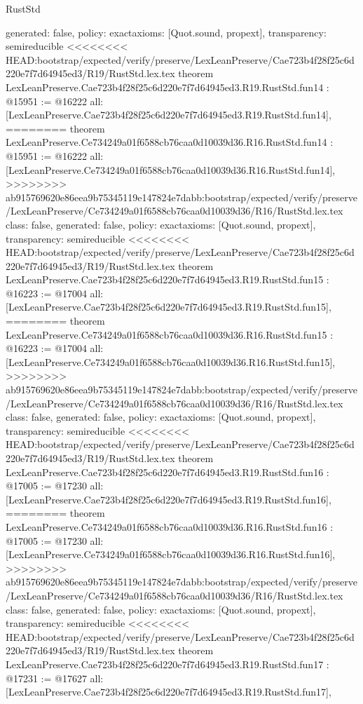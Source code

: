 \begin{lexlean}{RustStd}
\begin{coremodule}
{\begin{coremodule}
{{{{{{{{{{{{{{{{{  generated: false,
  policy: exact{axioms: [Quot.sound, propext]},
  transparency: semireducible
}
<<<<<<<< HEAD:bootstrap/expected/verify/preserve/LexLeanPreserve/Cae723b4f28f25c6d220e7f7d64945ed3/R19/RustStd.lex.tex
theorem LexLeanPreserve.Cae723b4f28f25c6d220e7f7d64945ed3.R19.RustStd.fun14 : @15951 := @16222 {
  all: [LexLeanPreserve.Cae723b4f28f25c6d220e7f7d64945ed3.R19.RustStd.fun14],
========
theorem LexLeanPreserve.Ce734249a01f6588cb76caa0d10039d36.R16.RustStd.fun14 : @15951 := @16222 {
  all: [LexLeanPreserve.Ce734249a01f6588cb76caa0d10039d36.R16.RustStd.fun14],
>>>>>>>> ab915769620e86eea9b75345119e147824e7dabb:bootstrap/expected/verify/preserve/LexLeanPreserve/Ce734249a01f6588cb76caa0d10039d36/R16/RustStd.lex.tex
  class: false,
  generated: false,
  policy: exact{axioms: [Quot.sound, propext]},
  transparency: semireducible
}
<<<<<<<< HEAD:bootstrap/expected/verify/preserve/LexLeanPreserve/Cae723b4f28f25c6d220e7f7d64945ed3/R19/RustStd.lex.tex
theorem LexLeanPreserve.Cae723b4f28f25c6d220e7f7d64945ed3.R19.RustStd.fun15 : @16223 := @17004 {
  all: [LexLeanPreserve.Cae723b4f28f25c6d220e7f7d64945ed3.R19.RustStd.fun15],
========
theorem LexLeanPreserve.Ce734249a01f6588cb76caa0d10039d36.R16.RustStd.fun15 : @16223 := @17004 {
  all: [LexLeanPreserve.Ce734249a01f6588cb76caa0d10039d36.R16.RustStd.fun15],
>>>>>>>> ab915769620e86eea9b75345119e147824e7dabb:bootstrap/expected/verify/preserve/LexLeanPreserve/Ce734249a01f6588cb76caa0d10039d36/R16/RustStd.lex.tex
  class: false,
  generated: false,
  policy: exact{axioms: [Quot.sound, propext]},
  transparency: semireducible
}
<<<<<<<< HEAD:bootstrap/expected/verify/preserve/LexLeanPreserve/Cae723b4f28f25c6d220e7f7d64945ed3/R19/RustStd.lex.tex
theorem LexLeanPreserve.Cae723b4f28f25c6d220e7f7d64945ed3.R19.RustStd.fun16 : @17005 := @17230 {
  all: [LexLeanPreserve.Cae723b4f28f25c6d220e7f7d64945ed3.R19.RustStd.fun16],
========
theorem LexLeanPreserve.Ce734249a01f6588cb76caa0d10039d36.R16.RustStd.fun16 : @17005 := @17230 {
  all: [LexLeanPreserve.Ce734249a01f6588cb76caa0d10039d36.R16.RustStd.fun16],
>>>>>>>> ab915769620e86eea9b75345119e147824e7dabb:bootstrap/expected/verify/preserve/LexLeanPreserve/Ce734249a01f6588cb76caa0d10039d36/R16/RustStd.lex.tex
  class: false,
  generated: false,
  policy: exact{axioms: [Quot.sound, propext]},
  transparency: semireducible
}
<<<<<<<< HEAD:bootstrap/expected/verify/preserve/LexLeanPreserve/Cae723b4f28f25c6d220e7f7d64945ed3/R19/RustStd.lex.tex
theorem LexLeanPreserve.Cae723b4f28f25c6d220e7f7d64945ed3.R19.RustStd.fun17 : @17231 := @17627 {
  all: [LexLeanPreserve.Cae723b4f28f25c6d220e7f7d64945ed3.R19.RustStd.fun17],
}}}}}}}}}}}}}}}}}}}}
\end{coremodule}}
\end{coremodule}
\end{lexlean}
